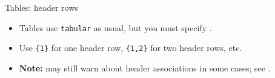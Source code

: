 \begin{frame}{Tables: header rows}

\small  
\begin{itemize}
\item Tables use \texttt{tabular} as usual, but you must  specify .  
\item Use \texttt{\{1\}} for one header row, \texttt{\{1,2\}} for two header rows, etc.
\item \textbf{Note:}  may still warn about header associations in some cases; see .
  
\vspace*{0.05in}
    

\end{itemize}

\vspace*{0.05in}
  

\end{frame}
